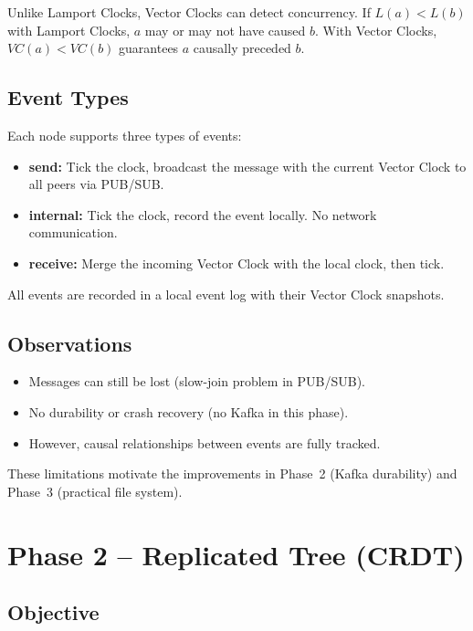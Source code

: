\documentclass[12pt, a4paper]{article}
\begin{document}
Unlike Lamport Clocks, Vector Clocks can detect concurrency. If $L(a) < L(b)$ with Lamport Clocks, $a$ may or may not have caused $b$. With Vector Clocks, $VC(a) < VC(b)$ guarantees $a$ causally preceded $b$.

\subsection{Event Types}

Each node supports three types of events:

\begin{itemize}
    \item \textbf{send:} Tick the clock, broadcast the message with the current Vector Clock to all peers via PUB/SUB.
    \item \textbf{internal:} Tick the clock, record the event locally. No network communication.
    \item \textbf{receive:} Merge the incoming Vector Clock with the local clock, then tick.
\end{itemize}

All events are recorded in a local event log with their Vector Clock snapshots.

\subsection{Observations}

\begin{itemize}
    \item Messages can still be lost (slow-join problem in PUB/SUB).
    \item No durability or crash recovery (no Kafka in this phase).
    \item However, causal relationships between events are fully tracked.
\end{itemize}

These limitations motivate the improvements in Phase~2 (Kafka durability) and Phase~3 (practical file system).

\section{Phase 2 -- Replicated Tree (CRDT)}

\subsection{Objective}
\end{document}

